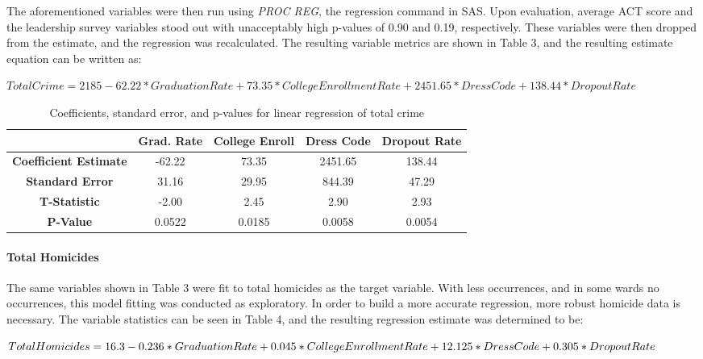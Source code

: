 \documentclass[12pt]{article}
\begin{document}
\par

The aforementioned variables were then run using \textit{PROC REG}, the regression command in SAS.  Upon evaluation, average ACT score and the leadership survey variables stood out with unacceptably high p-values of 0.90 and 0.19, respectively.  These variables were then dropped from the estimate, and the regression was recalculated.  The resulting variable metrics are shown in Table 3, and the resulting estimate equation can be written as: 

\begin{math}
TotalCrime = 2185 - 62.22*GraduationRate + 73.35*CollegeEnrollmentRate + 2451.65*DressCode + 138.44*DropoutRate
\end{math}

\begin{center}
	\begin{table}[h]
		\begin{tabular}{ c | c | c | c | c }
			
			& \textbf{Grad. Rate} & \textbf{College Enroll} & \textbf{Dress Code} & \textbf{Dropout Rate} \\
			\hline
			\textbf{Coefficient Estimate} & -62.22 & 73.35 & 2451.65 & 138.44 \\
			\textbf{Standard Error} & 31.16 & 29.95 & 844.39 & 47.29 \\
			\textbf{T-Statistic} & -2.00 & 2.45 & 2.90 & 2.93\\
			\textbf{P-Value} & 0.0522 & 0.0185 & 0.0058 & 0.0054		
		\end{tabular}
		\caption{Coefficients, standard error, and p-values for linear regression of total crime}
	\end{table}
\end{center}

\paragraph{Total Homicides}

The same variables shown in Table 3 were fit to total homicides as the target variable.  With less occurrences, and in some wards no occurrences, this model fitting was conducted as exploratory.  In order to build a more accurate regression, more robust homicide data is necessary.  The variable statistics can be seen in Table 4, and the resulting regression estimate was determined to be:

\begin{math}
TotalHomicides = 16.3 - 0.236*GraduationRate + 0.045*CollegeEnrollmentRate + 12.125*DressCode + 0.305*DropoutRate $$
\end{math}
\end{document}

